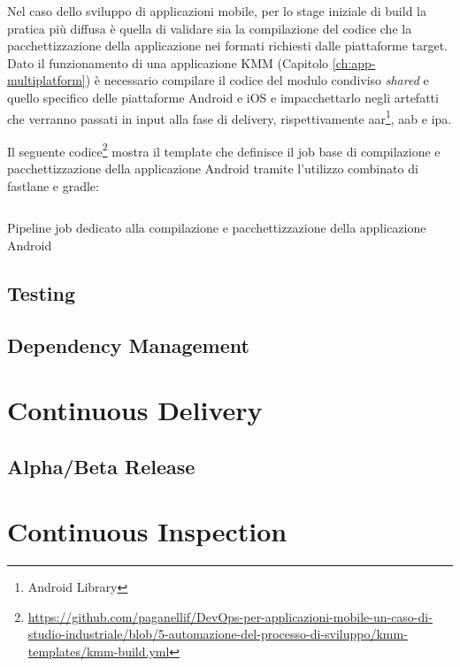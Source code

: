 Nel caso dello sviluppo di applicazioni mobile, per lo stage iniziale di build la pratica più diffusa è quella di validare sia la compilazione del codice che la pacchettizzazione della applicazione nei formati richiesti dalle piattaforme target. Dato il funzionamento di una applicazione KMM (Capitolo \ref{ch:app-multiplatform}) è necessario compilare il codice del modulo condiviso \textit{shared} e quello specifico delle piattaforme Android e iOS e impacchettarlo negli artefatti che verranno passati in input alla fase di delivery, rispettivamente aar\footnote{Android Library}, aab e ipa.

Il seguente codice\footnote{\href{https://github.com/paganellif/DevOps-per-applicazioni-mobile-un-caso-di-studio-industriale/blob/5-automazione-del-processo-di-sviluppo/kmm-templates/kmm-build.yml}{https://github.com/paganellif/DevOps-per-applicazioni-mobile-un-caso-di-studio-industriale/blob/5-automazione-del-processo-di-sviluppo/kmm-templates/kmm-build.yml}} mostra il template che definisce il job base di compilazione e pacchettizzazione della applicazione Android tramite l'utilizzo combinato di fastlane e gradle:
\begin{listing}[H]
    \inputminted{yaml}{code/build-job.yaml}
    \caption{Pipeline job dedicato alla compilazione e pacchettizzazione della applicazione Android}
\end{listing}

\subsection{Testing}

\subsection{Dependency Management}

\section{Continuous Delivery}

\subsection{Alpha/Beta Release}

\section{Continuous Inspection}
